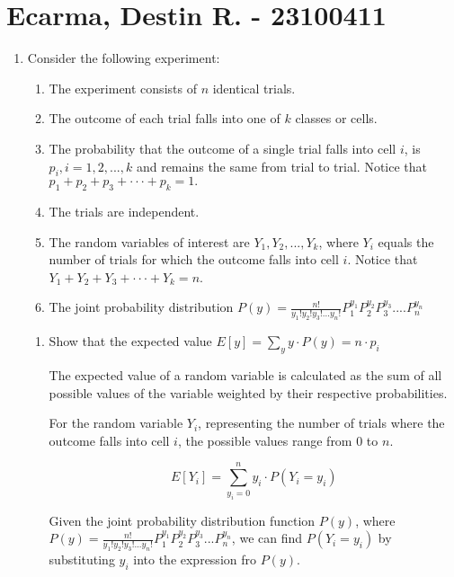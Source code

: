 \documentclass{article}
\begin{document}
\section*{Ecarma, Destin R. - 23100411}
\boldmath

\begin{enumerate}
	\item Consider the following experiment:

	      \begin{enumerate}
		      \item The experiment consists of $n$ identical trials.
		      \item The outcome of each trial falls into one of $k$ classes or cells.
		      \item The probability that the outcome of a single trial falls into cell $i$, is $p_i,i = 1,2,...,k$ and remains the same from trial to trial. Notice that $p_1+p_2+p_3+···+p_k =1.$
		      \item The trials are independent.
		      \item The random variables of interest are $Y_1 , Y_2 , . . . , Y_k$, where $Y_i$ equals the number of trials for which the outcome falls into cell $i$. Notice that $Y_1 +Y_2 +Y_3 +···+Y_k =n$.
		      \item The joint probability distribution $P(y) = \frac{n!}{y_1!y_2!y_3!...y_n!} P_1^{y_1} P_2^{y_2} P_3^{y_3}....P_n^{y_n}$
	      \end{enumerate}

	      \begin{enumerate}[label=1.\arabic*]
		      \item Show that the expected value $E[y] = \sum_{y} y \cdotp P(y) = n \cdot p_i$

		            The expected value of a random variable is calculated as the sum of all possible values of the variable weighted by their respective probabilities.

		            For the random variable $Y_i$, representing the number of trials where the outcome falls into cell $i$, the possible values range from $0$ to $n$.

		            \begin{equation}
			            E[Y_i] = \sum_{y_i=0}^{n} y_i \cdot P(Y_i = y_i)
		            \end{equation}

		            Given the joint probability distribution function $P(y)$, where $P(y) = \frac{n!}{y_1! y_2! y_3! ... y_n!}P_1^{y_1} P_2^{y_2} P_3^{y_3} ... P_n^{y_n}$, we can find $P(Y_i = y_i)$ by substituting $y_i$ into the expression fro $P(y)$.


\end{enumerate}
\end{enumerate}
\end{document}
